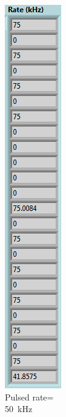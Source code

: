 \begin{figure}[H]
\begin{minipage}{0.24\textwidth}
		\caption{Pulsed rate=\\50~kHz}
		\label{fig:50khz}
	\end{minipage}
	\begin{minipage}{0.24\textwidth}
		\centering
		\includegraphics[width=.7\linewidth]{IMG/ch5/latch_tests/fig18}

\end{minipage}
\end{figure}

